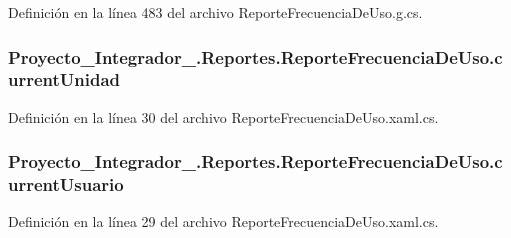 Definición en la línea 483 del archivo Reporte\-Frecuencia\-De\-Uso.\-g.\-cs.

\hypertarget{class_proyecto___integrador__3_1_1_reportes_1_1_reporte_frecuencia_de_uso_a518c39e6486c8e68350a36322f04a4ad}{
\subsubsection[{current\-Unidad}]{ Proyecto\-\_\-\-Integrador\-\_.\-Reportes.\-Reporte\-Frecuencia\-De\-Uso.\-current\-Unidad\hspace{0.3cm}{\ttfamily [private]}}}\label{class_proyecto___integrador__3_1_1_reportes_1_1_reporte_frecuencia_de_uso_a518c39e6486c8e68350a36322f04a4ad}


Definición en la línea 30 del archivo Reporte\-Frecuencia\-De\-Uso.\-xaml.\-cs.

\hypertarget{class_proyecto___integrador__3_1_1_reportes_1_1_reporte_frecuencia_de_uso_ad32fba0c33dc851eee94df8e83afb5f3}{
\subsubsection[{current\-Usuario}]{ Proyecto\-\_\-\-Integrador\-\_.\-Reportes.\-Reporte\-Frecuencia\-De\-Uso.\-current\-Usuario\hspace{0.3cm}{\ttfamily [private]}}}\label{class_proyecto___integrador__3_1_1_reportes_1_1_reporte_frecuencia_de_uso_ad32fba0c33dc851eee94df8e83afb5f3}


Definición en la línea 29 del archivo Reporte\-Frecuencia\-De\-Uso.\-xaml.\-cs.

